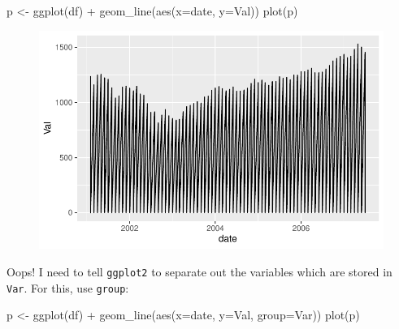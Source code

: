 \documentclass[
  letterpaper,
]{book}
\newenvironment{Shaded}{\begin{snugshade}}{\end{snugshade}}
\newcommand{\AttributeTok}[1]{\textcolor[rgb]{0.40,0.45,0.13}{#1}}
\newcommand{\FunctionTok}[1]{\textcolor[rgb]{0.28,0.35,0.67}{#1}}
\newcommand{\NormalTok}[1]{\textcolor[rgb]{0.00,0.23,0.31}{#1}}
\newcommand{\OtherTok}[1]{\textcolor[rgb]{0.00,0.23,0.31}{#1}}
\newcommand{\SpecialCharTok}[1]{\textcolor[rgb]{0.37,0.37,0.37}{#1}}
\begin{document}
\begin{Shaded}
\begin{Highlighting}[]
\NormalTok{p  }\OtherTok{\textless{}{-}} \FunctionTok{ggplot}\NormalTok{(df) }\SpecialCharTok{+}
  \FunctionTok{geom\_line}\NormalTok{(}\FunctionTok{aes}\NormalTok{(}\AttributeTok{x=}\NormalTok{date, }\AttributeTok{y=}\NormalTok{Val))}
\FunctionTok{plot}\NormalTok{(p)}
\end{Highlighting}
\end{Shaded}

\begin{figure}[H]

{\centering \includegraphics{Appendix1_files/figure-pdf/unnamed-chunk-7-1.pdf}

}

\end{figure}

Oops! I need to tell \texttt{ggplot2} to separate out the variables
which are stored in \texttt{Var}. For this, use \texttt{group}:

\begin{Shaded}
\begin{Highlighting}[]
\NormalTok{p  }\OtherTok{\textless{}{-}} \FunctionTok{ggplot}\NormalTok{(df) }\SpecialCharTok{+}
  \FunctionTok{geom\_line}\NormalTok{(}\FunctionTok{aes}\NormalTok{(}\AttributeTok{x=}\NormalTok{date, }\AttributeTok{y=}\NormalTok{Val, }\AttributeTok{group=}\NormalTok{Var))}
\FunctionTok{plot}\NormalTok{(p)}
\end{Highlighting}
\end{Shaded}
\end{document}
